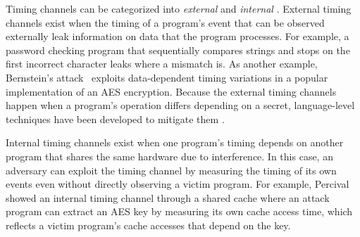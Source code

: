 Timing channels can be categorized into {\em external} and {\em internal} 
\cite{mitigation3}. 
External timing channels exist when the timing of a program's event that
can be observed externally leak information on data that the program processes. 
For example, a password checking program that sequentially compares strings
and stops on the first incorrect character leaks where a mismatch is.
As another example, Bernstein's attack~\cite{bernstein} exploits data-dependent
timing variations in a popular implementation of an AES encryption.
Because the external timing channels happen when a program's operation differs
depending on a secret, language-level techniques have been developed to
mitigate them \cite{timesens,mitigation1,mitigation2,mitigation3}. 


Internal timing channels exist when one program's timing depends on another
program that shares the same hardware due to interference. In this case,
an adversary can exploit the timing channel by measuring the timing of its
own events even without directly observing a victim program.
For example, Percival~\cite{percival} showed an internal timing channel
through a shared cache where an attack program can extract an AES key
by measuring its own cache access time, which reflects a victim program's
cache accesses that depend on the key.



